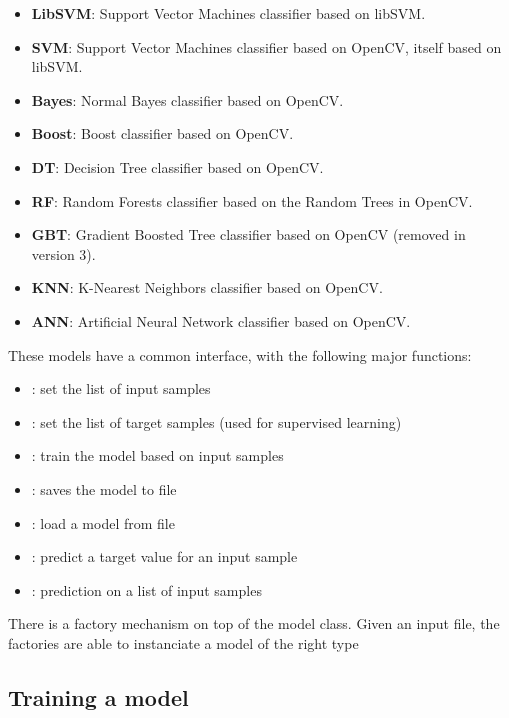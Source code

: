 \begin{itemize}
  \item \textbf{LibSVM}: Support Vector Machines classifier based on libSVM.
  \item \textbf{SVM}: Support Vector Machines classifier based on OpenCV, itself based on libSVM.
  \item \textbf{Bayes}: Normal Bayes classifier based on OpenCV.
  \item \textbf{Boost}: Boost classifier based on OpenCV.
  \item \textbf{DT}: Decision Tree classifier based on OpenCV.
  \item \textbf{RF}: Random Forests classifier based on the Random Trees in OpenCV.
  \item \textbf{GBT}: Gradient Boosted Tree classifier based on OpenCV (removed in version 3).
  \item \textbf{KNN}: K-Nearest Neighbors classifier based on OpenCV.
  \item \textbf{ANN}: Artificial Neural Network classifier based on OpenCV.
\end{itemize}

These models have a common interface, with the following major functions:
\begin{itemize}
  \item {} : set the list of input samples
  \item {} : set the list of target samples (used for supervised learning)
  \item {} : train the model based on input samples
  \item {} : saves the model to file
  \item {} : load a model from file
  \item {} : predict a target value for an input sample
  \item {} : prediction on a list of input samples
\end{itemize}

There is a factory mechanism on top of the model class. Given an input file,
the factories are able to instanciate a model of the right type
\subsection{Training a model}

